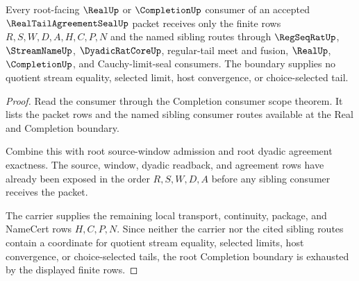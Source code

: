 \begin{theorem}
\label{thm:real-tail-agreement-seal-root-completion-boundary}
Every root-facing $\RealUp$ or $\CompletionUp$ consumer of an accepted $\RealTailAgreementSealUp$ packet receives only the finite rows $R,S,W,D,A,H,C,P,N$ and the named sibling routes through $\RegSeqRatUp$, $\StreamNameUp$, $\DyadicRatCoreUp$, regular-tail meet and fusion, $\RealUp$, $\CompletionUp$, and Cauchy-limit-seal consumers. The boundary supplies no quotient stream equality, selected limit, host convergence, or choice-selected tail.
\end{theorem}
\begin{proof}
Read the consumer through the Completion consumer scope theorem. It lists the packet rows and the named sibling consumer routes available at the Real and Completion boundary.

Combine this with root source-window admission and root dyadic agreement exactness. The source, window, dyadic readback, and agreement rows have already been exposed in the order $R,S,W,D,A$ before any sibling consumer receives the packet.

The carrier supplies the remaining local transport, continuity, package, and NameCert rows $H,C,P,N$. Since neither the carrier nor the cited sibling routes contain a coordinate for quotient stream equality, selected limits, host convergence, or choice-selected tails, the root Completion boundary is exhausted by the displayed finite rows.
\end{proof}

